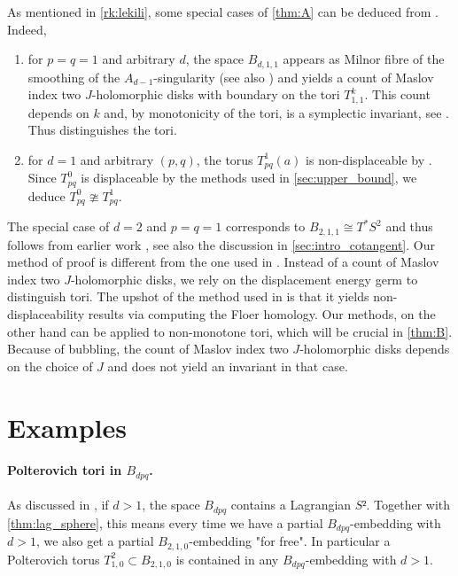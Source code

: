 \documentclass[12pt,a4paper,abstract=true,draft]{scrartcl}
\begin{document}
\begin{remark}
    \label{rk:lekili2}
    As mentioned in \cref{rk:lekili}, some special cases of \cref{thm:A} can be deduced from \cite{LekMay14}. Indeed, 
    \begin{enumerate}
        \item for $p = q = 1$ and arbitrary $d$, the space $B_{d,1,1}$ appears as Milnor fibre of the smoothing of the $A_{d-1}$-singularity (see also \cite[Section 7.3]{evans2021atfs}) and \cite[Lemma 2.19]{LekMay14} yields a count of Maslov index two $J$-holomorphic disks with boundary on the tori $T^k_{1,1}$. This count depends on $k$ and, by monotonicity of the tori, is a symplectic invariant, see \cite{EliPol97}. Thus \cite[Lemma 2.19]{LekMay14} distinguishes the tori.
        \item for $d = 1$ and arbitrary $(p,q)$, the torus $T^1_{pq}(a)$ is non-displaceable by \cite[Proposition 3.6]{LekMay14}. Since $T^0_{pq}$ is displaceable by the methods used in \cref{sec:upper_bound}, we deduce $T^0_{pq} \ncong T^1_{pq}$.
    \end{enumerate}
    The special case of $d=2$ and $p=q=1$ corresponds to $B_{2,1,1} \cong T^*S^2$ and thus follows from earlier work \cite{AlbFra08}, see also the discussion in \cref{sec:intro_cotangent}. Our method of proof is different from the one used in \cite{LekMay14}. Instead of a count of Maslov index two $J$-holomorphic disks, we rely on the displacement energy germ to distinguish tori. The upshot of the method used in \cite{LekMay14} is that it yields non-displaceability results via computing the Floer homology. Our methods, on the other hand can be applied to non-monotone tori, which will be crucial in \cref{thm:B}. Because of bubbling, the count of Maslov index two $J$-holomorphic disks depends on the choice of $J$ and does not yield an invariant in that case.
\end{remark}

\section{Examples}
\label{sec:examples}

\paragraph{Polterovich tori in \texorpdfstring{$B_{dpq}$}{B_dpq}.}
As discussed in \cite[Remark 7.10]{evans2021atfs}, if $d>1$, the space $B_{dpq}$ contains a Lagrangian $S²$.
Together with \cref{thm:lag_sphere}, this means every time we have a partial $B_{dpq}$-embedding with $d>1$, we also get a partial $B_{2,1,0}$-embedding "for free".
In particular a Polterovich torus $T^2_{1,0} ⊂ B_{2,1,0}$ is contained in any $B_{dpq}$-embedding with $d>1$.
\end{document}
